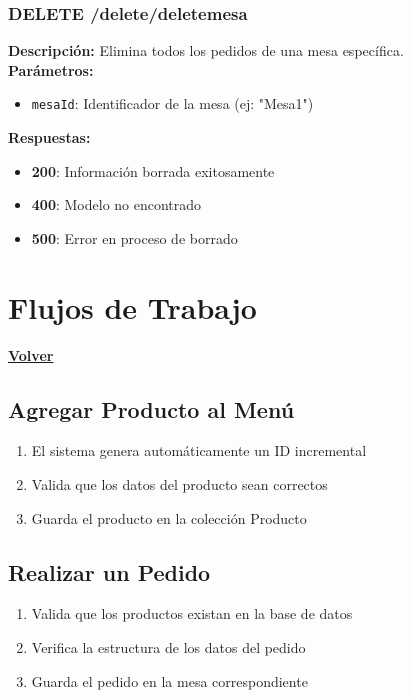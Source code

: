 \documentclass[12pt]{article}
\begin{document}
\subsubsection{DELETE /delete/deletemesa}
\textbf{Descripción:} Elimina todos los pedidos de una mesa específica.\\

\textbf{Parámetros:}
\begin{itemize}
    \item \texttt{mesaId}: Identificador de la mesa (ej: "Mesa1")
\end{itemize}

\textbf{Respuestas:}
\begin{itemize}
    \item \textbf{200}: Información borrada exitosamente
    \item \textbf{400}: Modelo no encontrado
    \item \textbf{500}: Error en proceso de borrado
\end{itemize}

\clearpage

\section{Flujos de Trabajo}
\hyperlink{anchor-indice}{\textbf{Volver}}\\

\subsection{Agregar Producto al Menú}
\begin{enumerate}
    \item El sistema genera automáticamente un ID incremental
    \item Valida que los datos del producto sean correctos
    \item Guarda el producto en la colección Producto
\end{enumerate}

\subsection{Realizar un Pedido}
\begin{enumerate}
    \item Valida que los productos existan en la base de datos
    \item Verifica la estructura de los datos del pedido
    \item Guarda el pedido en la mesa correspondiente
\end{enumerate}
\end{document}
